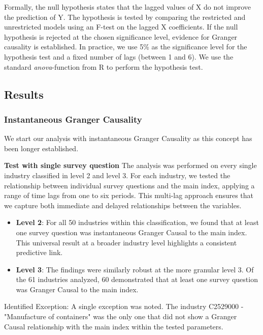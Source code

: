 Formally, the null hypothesis states that the lagged values of X do not improve the prediction of Y. The hypothesis is tested by comparing the restricted and unrestricted models using an F-test on the lagged X coefficients. If the null hypothesis is rejected at the chosen significance level, evidence for Granger causality is established. In practice, we use 5\% as the significance level for the hypothesis test and a fixed number of lags (between 1 and 6). We use the standard \textit{anova}-function from R to perform the hypothesis test.



\subsection{Results}

\subsubsection{Instantaneous Granger Causality}
We start our analysis with instantaneous Granger Causality as this concept has been longer established.
\newline

\textbf{Test with single survey question} 
\newline
The analysis was performed on every single industry classified in level 2 and level 3. For each industry, we tested the relationship between individual survey questions and the main index, applying a range of time lags from one to six periods. This multi-lag approach ensures that we capture both immediate and delayed relationships between the variables.

\begin{itemize}
    \item \textbf{Level 2}: For all 50 industries within this classification, we found that at least one survey question was instantaneous Granger Causal to the main index. This universal result at a broader industry level highlights a consistent predictive link.
    \item \textbf{Level 3}: The findings were similarly robust at the more granular level 3. Of the 61 industries analyzed, 60 demonstrated that at least one survey question was Granger Causal to the main index.
\end{itemize}





Identified Exception: A single exception was noted. The industry C2529000 - "Manufacture of containers" was the only one that did not show a Granger Causal relationship with the main index within the tested parameters.
\newline






